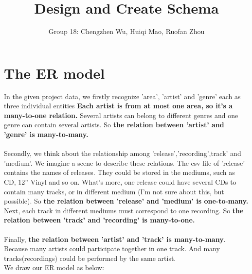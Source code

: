 \documentclass[11pt]{article} %
\title{Design and Create Schema}
\author{Group 18: Chengzhen Wu, Huiqi Mao, Ruofan Zhou}
\begin{document}
\maketitle

\section{The ER model}
In the given project data, we firstly recognize 'area', 'artist' and 'genre' each as three individual entities \textbf{Each artist is from at most one area, so it's a many-to-one relation.} Several artists can belong to different genres and one genre can contain several artists. So \textbf{the relation between 'artist' and 'genre' is many-to-many. }\\ \\
Secondly, we  think about the relationship among 'release','recording',track' and 'medium'. We imagine a scene to describe these relations. The csv file of 'release' contains the names of releases. They could be stored in the mediums, such as CD, 12'' Vinyl and so on. What's more, one release could have several CDs to contain many tracks, or in different medium (I'm not sure about this, but possible).  So \textbf{the relation between 'release' and 'medium' is one-to-many.} Next, each track in different mediums must correspond to one recording. So \textbf{the relation between 'track' and 'recording' is many-to-one.}\\ \\
Finally, \textbf{the relation between 'artist' and 'track' is many-to-many}. Because many artists could participate together in one track. And many tracks(recordings) could be performed by the same artist.\\


We draw our ER model as below:
\\
\\
\end{document}
